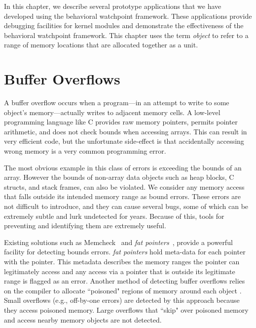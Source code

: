In this chapter, we describe several prototype applications that we have developed using the behavioral watchpoint framework. These applications provide debugging facilities for kernel modules and demonstrate the effectiveness of the behavioral watchpoint framework. This chapter uses the term \emph{object} to refer to a range of memory locations that are allocated together as a unit.





\section{Buffer Overflows \label{sec:buffer_overflows}}
A buffer overflow occurs when a program---in an attempt to write to some object's memory---actually writes to adjacent memory cells. A low-level programming language like C provides raw memory pointers, permits pointer arithmetic, and does not check bounds when accessing arrays. This can result in very efficient code, but the unfortunate side-effect is that accidentally accessing wrong memory is a very common programming error.

The most obvious example in this class of errors is exceeding the bounds of an array. However the bounds of non-array data objects such as heap blocks, C structs, and stack frames, can also be violated. We consider any memory access that falls outside its intended memory range as bound errors. These errors are not difficult to introduce, and they can cause several bugs, some of which can be extremely subtle and lurk undetected for years. Because of this, tools for preventing and identifying them are extremely useful. 

Existing solutions such as Memcheck~\cite{Memcheck} and \emph{fat pointers}~\cite{BccFatPointers}, provide a powerful facility for detecting bounds errors. \emph{fat pointers} hold meta-data for each pointer with the pointer. This metadata describes the memory ranges the pointer can legitimately access and any access via a pointer that is outside its legitimate range is flagged as an error. Another method of detecting buffer overflows relies on the compiler to allocate ``poisoned" regions of memory around each object \cite{AddressSanitizer}. Small overflows (e.g., off-by-one errors) are detected by this approach because they access poisoned memory. Large overflows that ``skip" over poisoned memory and access nearby memory objects are not detected.

